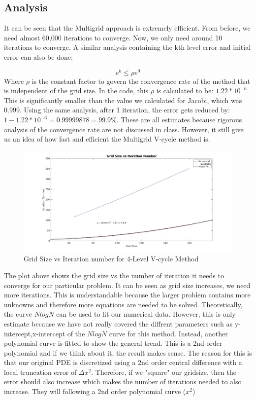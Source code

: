 \documentclass{article}
\begin{document}
\subsection{Analysis}

It can be seen that the Multigrid approach is extremely efficient. From before, we need almost 60,000 iterations to converge.  Now, we only need around 10 iterations to converge. A similar analysis containing the kth level error and initial error can also be done: 

\begin{equation}
	e^{k} \leq \rho e^{0}
\end{equation} 
\noindent
Where $\rho$ is the constant factor to govern the convergence rate of the method that is independent of the grid size. In the code, this $\rho$ is calculated to be: \textbf{$1.22*10^{-6}$}.  This is significantly smaller than the value we calculated for Jacobi, which was 0.999. Using the same analysis, after 1 iteration, the error gets reduced by: $1-1.22*10^{-6} = 0.99999878 = 99.9\%$.  These are all estimates because rigorous analysis of the convergence rate are not discussed in class. However, it still give us an idea of how fast and efficient the Multigrid V-cycle method is. 

\begin{figure}[H]
	\includegraphics[width=\linewidth]{gridsize_iter.jpg}	
	\caption{Grid Size vs Iteration number for 4-Level V-cycle Method}
\end{figure}

\noindent
The plot above shows the grid size vs the number of iteration it needs to converge for our particular problem. It can be seen as grid size increases, we need more iterations. This is understandable because the larger problem contains more unknowns and therefore more equations are needed to be solved. Theoretically, the curve $NlogN$ can be used to fit our numerical data.  However, this is only estimate because we have not really covered the diffrent parameters such as y-intercept,x-intercept of the $NlogN$ curve for this method. Instead, another polynomial curve is fitted to show the general trend. This is a 2nd order polynomial and if we think about it, the result makes sense.  The reason for this is that our original PDE is discretized using a 2nd order central difference with a local truncation error of $\Delta x^2$. Therefore, if we "square" our gridsize, then the error should also increase which makes the number of iterations needed to also increase. They will following a 2nd order polynomial curve ($x^2$)
\end{document}
